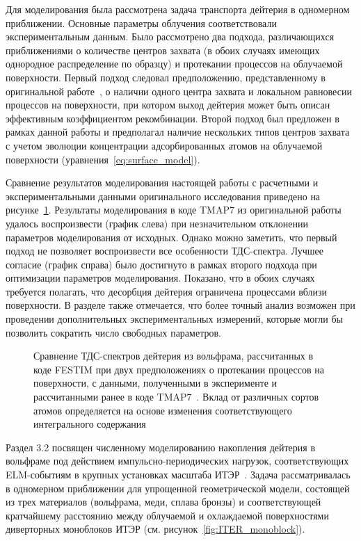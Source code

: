 Для моделирования была рассмотрена задача транспорта дейтерия в одномерном приближении. Основные параметры облучения соответствовали экспериментальным данным. Было рассмотрено два подхода, различающихся приближениями о количестве центров захвата (в обоих случаях имеющих однородное распределение по образцу) и протекании процессов на облучаемой поверхности. Первый подход следовал предположению, представленному в оригинальной работе~\cite{Poskakalov2020}, о наличии одного центра захвата и локальном равновесии процессов на поверхности, при котором выход дейтерия может быть описан эффективным коэффициентом рекомбинации. Второй подход был предложен в рамках данной работы и предполагал наличие нескольких типов центров захвата с учетом эволюции концентрации адсорбированных атомов на облучаемой поверхности (уравнения~\cref{eq:surface_model}). 

Сравнение результатов моделирования настоящей работы с расчетными и экспериментальными данными оригинального исследования приведено на рисунке~\cref{fig:QSPA_TDS}. Результаты моделирования в коде TMAP7 из оригинальной работы удалось воспроизвести (график слева) при незначительном отклонении параметров моделирования от исходных. Однако можно заметить, что первый подход не позволяет воспроизвести все особенности ТДС-спектра. Лучшее согласие (график справа) было достигнуто в рамках второго подхода при оптимизации параметров моделирования. Показано, что в обоих случаях требуется полагать, что десорбция дейтерия ограничена процессами вблизи поверхности. В разделе также отмечается, что более точный анализ возможен при проведении дополнительных экспериментальных измерений, которые могли бы позволить сократить число свободных параметров. 

\begin{figure}[ht]
	\caption{Сравнение ТДС-спектров дейтерия из вольфрама, рассчитанных в коде FESTIM при двух предположениях о протекании процессов на поверхности, с данными, полученными в эксперименте и рассчитанными ранее в коде TMAP7~\cite{Poskakalov2020}. Вклад от различных сортов атомов определяется на основе изменения соответствующего интегрального содержания}\label{fig:QSPA_TDS}
\end{figure}

Раздел 3.2 посвящен численному моделированию накопления дейтерия в вольфраме под действием импульсно-периодических нагрузок, соответствующих ELM-событиям в крупных установках масштаба ИТЭР~\cite{Kulagin2025_JNM}. Задача рассматривалась в одномерном приближении для упрощенной геометрической модели, состоящей из трех материалов (вольфрама, меди, сплава бронзы) и соответствующей кратчайшему расстоянию между облучаемой и охлаждаемой поверхностями диверторных моноблоков ИТЭР (см. рисунок~\cref{fig:ITER_monoblock}). 

